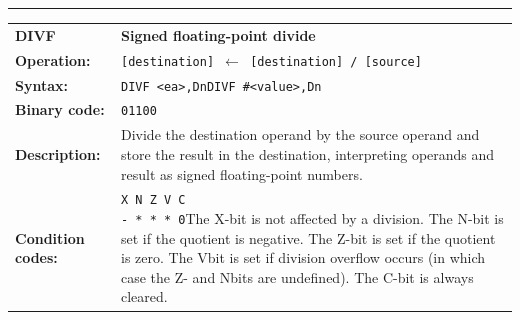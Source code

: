 \documentclass[]{article}
\begin{document}
\begin{appendices}
\noindent\rule{\textwidth}{1pt}\newline %
\setlength\extrarowheight{5pt} %
\begin{tabularx}{\textwidth}{lL}
  {\Large \textbf{DIVF}} 	& {\Large \textbf{Signed floating-point divide}}\\
  \textbf{Operation:} 		& \texttt{[destination] $\leftarrow$ [destination] / [source]}\\
  \textbf{Syntax:}  		& \texttt{DIVF <ea>,Dn}\newline\texttt{DIVF \#<value>,Dn}\\
  \textbf{Binary code:} 	& \texttt{01100}\\
  \textbf{Description:}  	& Divide the destination operand by the source operand and store
the result in the destination, interpreting operands and result as signed floating-point numbers.\\
  \textbf{Condition codes:} & \texttt{X N Z V C\newline - * * * 0}\newline\newline The X-bit is not affected by a division. The N-bit is set if the
quotient is negative. The Z-bit is set if the quotient is zero. The Vbit
is set if division overflow occurs (in which case the Z- and Nbits
are undefined). The C-bit is always cleared.\\
\end{tabularx}
\newline


\end{appendices}
\end{document}
